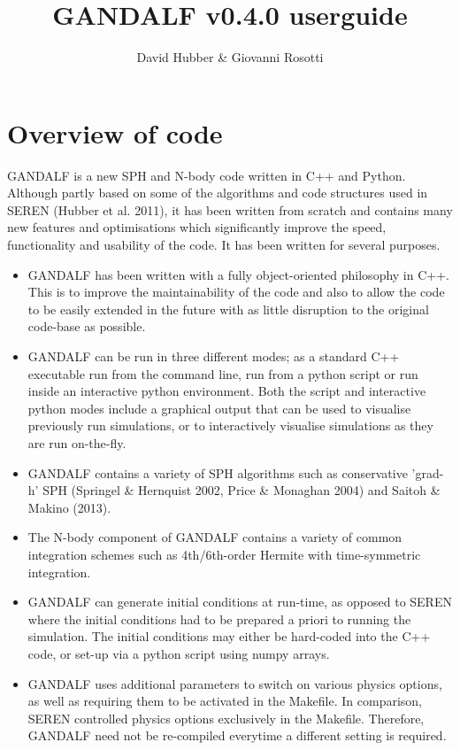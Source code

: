 \documentclass[a4paper]{article}
\newcommand{\VERNO}{0.4.0 }
\begin{document}

\title{GANDALF v\VERNO userguide}
\author{David Hubber \& Giovanni Rosotti}

\maketitle
\tableofcontents

\newpage


\section{Overview of code}
GANDALF is a new SPH and N-body code written in C++ and Python.  Although partly based on some of the algorithms and code structures used in SEREN (Hubber et al. 2011), it has been written from scratch and contains many new features and optimisations which significantly improve the speed, functionality and usability of the code.  It has been written for several purposes.
\begin{itemize}
\item GANDALF has been written with a fully object-oriented philosophy in C++.  This is to improve the maintainability of the code and also to allow the code to be easily extended in the future with as little disruption to the original code-base as possible.
\item GANDALF can be run in three different modes; as a standard C++ executable run from the command line, run from a python script or run inside an interactive python environment.  Both the script and interactive python modes include a graphical output that can be used to visualise previously run simulations, or to interactively visualise simulations as they are run on-the-fly.
\item GANDALF contains a variety of SPH algorithms such as conservative 'grad-h' SPH (Springel \& Hernquist 2002, Price \& Monaghan 2004) and Saitoh \& Makino (2013).
\item The N-body component of GANDALF contains a variety of common integration schemes such as 4th/6th-order Hermite with time-symmetric integration.
\item GANDALF can generate initial conditions at run-time, as opposed to SEREN where the initial conditions had to be prepared a priori to running the simulation.  The initial conditions may either be hard-coded into the C++ code, or set-up via a python script using numpy arrays.
\item GANDALF uses additional parameters to switch on various physics options, as well as requiring them to be activated in the Makefile.  In comparison, SEREN controlled physics options exclusively in the Makefile.  Therefore, GANDALF need not be re-compiled everytime a different setting is required.
\end{itemize}
\end{document}
